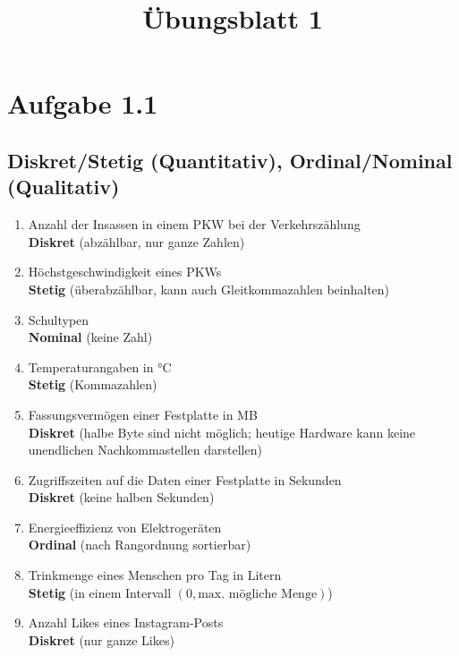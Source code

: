 \documentclass[a4paper,12pt]{article}
\title{Übungsblatt 1}
\author{}
\date{}
\begin{document}
	\maketitle
	
	\section*{Aufgabe 1.1}
	\subsection*{Diskret/Stetig (Quantitativ), Ordinal/Nominal (Qualitativ)}
	
	\begin{enumerate}
		\item Anzahl der Insassen in einem PKW bei der Verkehrszählung\\
		\textbf{Diskret} (abzählbar, nur ganze Zahlen)
		
		\item Höchstgeschwindigkeit eines PKWs\\
		\textbf{Stetig} (überabzählbar, kann auch Gleitkommazahlen beinhalten)
		
		\item Schultypen\\
		\textbf{Nominal} (keine Zahl)
		
		\item Temperaturangaben in °C\\
		\textbf{Stetig} (Kommazahlen)
		
		\item Fassungsvermögen einer Festplatte in MB\\
		\textbf{Diskret} (halbe Byte sind nicht möglich; heutige Hardware kann keine unendlichen Nachkommastellen darstellen)
		
		\item Zugriffszeiten auf die Daten einer Festplatte in Sekunden\\
		\textbf{Diskret} (keine halben Sekunden)
		
		\item Energieeffizienz von Elektrogeräten\\
		\textbf{Ordinal} (nach Rangordnung sortierbar)
		
		\item Trinkmenge eines Menschen pro Tag in Litern\\
		\textbf{Stetig} (in einem Intervall $(0, \text{max. mögliche Menge})$)
		
		\item Anzahl Likes eines Instagram-Posts\\
		\textbf{Diskret} (nur ganze Likes)
		

\end{enumerate}
\end{document}
